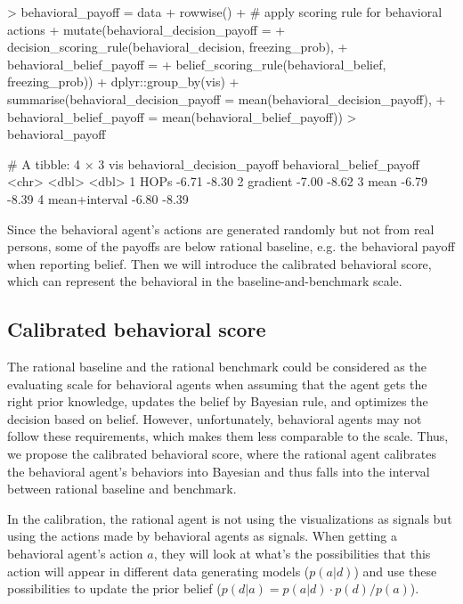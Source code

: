 \documentclass{article}
\begin{document}
\begin{Schunk}
\begin{Sinput}
> behavioral_payoff = data %>%
+   rowwise() %>%
+   # apply scoring rule for behavioral actions
+   mutate(behavioral_decision_payoff = 
+            decision_scoring_rule(behavioral_decision, freezing_prob),
+          behavioral_belief_payoff = 
+            belief_scoring_rule(behavioral_belief, freezing_prob)) %>%
+   dplyr::group_by(vis) %>%
+   summarise(behavioral_decision_payoff = mean(behavioral_decision_payoff),
+             behavioral_belief_payoff = mean(behavioral_belief_payoff))
> behavioral_payoff
\end{Sinput}
\begin{Soutput}
# A tibble: 4 × 3
  vis           behavioral_decision_payoff behavioral_belief_payoff
  <chr>                              <dbl>                    <dbl>
1 HOPs                               -6.71                    -8.30
2 gradient                           -7.00                    -8.62
3 mean                               -6.79                    -8.39
4 mean+interval                      -6.80                    -8.39
\end{Soutput}
\end{Schunk}

Since the behavioral agent's actions are generated randomly but not from real persons, some of the payoffs are below rational baseline, e.g. the behavioral payoff when reporting belief. Then we will introduce the calibrated behavioral score, which can represent the behavioral in the baseline-and-benchmark scale.

\subsection{Calibrated behavioral score}

The rational baseline and the rational benchmark could be considered as the evaluating scale for behavioral agents when assuming that the agent gets the right prior knowledge, updates the belief by Bayesian rule, and optimizes the decision based on belief. However, unfortunately, behavioral agents may not follow these requirements, which makes them less comparable to the scale. Thus, we propose the calibrated behavioral score, where the rational agent calibrates the behavioral agent's behaviors into Bayesian and thus falls into the interval between rational baseline and benchmark.

In the calibration, the rational agent is not using the visualizations as signals but using the actions made by behavioral agents as signals. When getting a behavioral agent's action $a$, they will look at what's the possibilities that this action will appear in different data generating models ($p(a|d)$) and use these possibilities to update the prior belief ($p(d|a) = p(a|d) \cdot p(d) / p(a)$).
\end{document}
